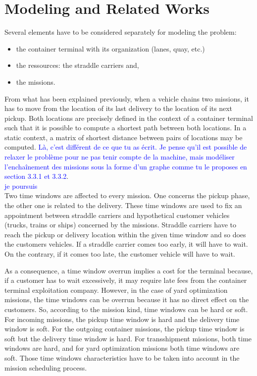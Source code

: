 \documentclass[a4paper,10pt]{article}
\begin{document}
\section{Modeling and Related Works}

Several elements have to be considered separately for modeling the problem: 

\begin{itemize}
\item the container terminal with its organization (lanes, quay, etc.) 
\item the ressources: the straddle carriers and, 
\item the missions.
\end{itemize}

From what has been explained previously, when a vehicle chains two missions, it has to move from the location of its last delivery to the location of its next pickup. Both locations are precisely defined in the context of a container terminal such that it is possible to compute a shortest path between both locations. In a static context, a matrix of shortest distance between pairs of locations may be computed. \textcolor{blue}{Là, c'est différent de ce que tu as écrit. Je pense qu'il est possible de relaxer le problème pour ne pas tenir compte de la machine, mais modéliser l'enchaînement des missions sous la forme d'un graphe comme tu le proposes en section 3.3.1 et 3.3.2}.\\
\textcolor{blue}{je poursuis}\\

Two time windows are affected to every mission. One concerns the pickup phase, the other one is related to the delivery. These time windows are used to fix an appointment between straddle carriers and hypothetical customer vehicles (trucks, trains or ships) concerned by the missions. Straddle carriers have to reach the pickup or delivery location within the given time window and so does the customers vehicles. If a straddle carrier comes too early, it will have to wait. On the contrary, if it comes too late, the customer vehicle will have to wait.

As a consequence, a time window overrun implies a cost for the terminal because, if a customer has to wait excessively, it may require late fees from the container terminal exploitation company. However, in the case of yard optimization missions, the time windows can be overrun because it has no direct effect on the customers. So, according to the mission kind, time windows can be hard or soft. For incoming missions, the pickup time window is hard and the delivery time window is soft. For the outgoing container missions, the pickup time window is soft but the delivery time window is hard. For transshipment missions, both time windows are hard, and for yard optimization missions both time windows are soft. Those time windows characteristics have to be taken into account in the mission scheduling process\cite{Lesauvage2009}.
\end{document}
